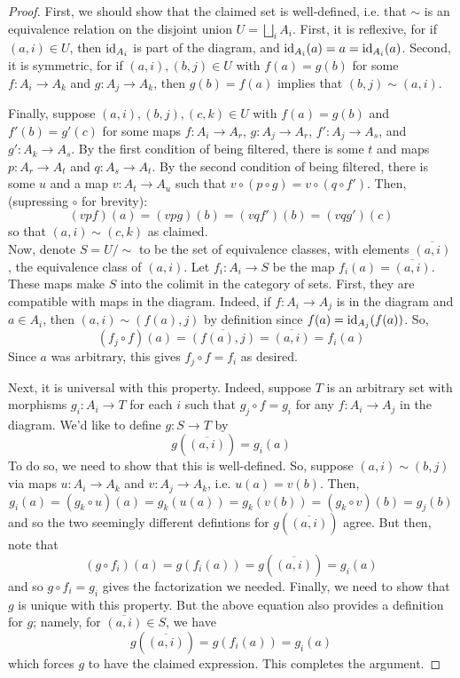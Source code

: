 \documentclass[12pt]{exam}
\begin{document}
\begin{proof}
	First, we should show that the claimed set is well-defined, i.e. that $\sim$ is an equivalence relation on the disjoint union $U = \bigsqcup_i A_i$. First, it is reflexive, for if $(a,i) \in U$, then $\operatorname{id}_{A_i}$ is part of the diagram, and $\operatorname{id}_{A_i}(a) = a = \operatorname{id}_{A_i}(a)$. Second, it is symmetric, for if $(a,i),(b,j) \in U$ with $f(a) = g(b)$ for some $f : A_i \to A_k$ and $g : A_j \to A_k$, then $g(b) = f(a)$ implies that $(b,j) \sim (a,i)$.
	
	Finally, suppose $(a,i),(b,j),(c,k) \in U$ with $f(a) = g(b)$ and $f'(b) = g'(c)$ for some maps $f : A_i \to A_r$, $g : A_j \to A_r$, $f' : A_j \to A_s$, and $g' : A_k \to A_s$. By the first condition of being filtered, there is some $t$ and maps $p : A_r \to A_t$ and $q : A_s \to A_t$. By the second condition of being filtered, there is some $u$ and a map $v : A_t \to A_u$ such that $v \circ (p \circ g) = v \circ (q \circ f')$. Then, (supressing $\circ$ for brevity):
	\[ (vpf)(a) = (vpg)(b) = (vqf')(b) = (vqg')(c) \]
	so that $(a,i) \sim (c,k)$ as claimed. \\
	
	Now, denote $S = U/\sim$ to be the set of equivalence classes, with elements $\overline{(a,i)}$, the equivalence class of $(a,i)$. Let $f_i : A_i \to S$ be the map $f_i(a) = \overline{(a,i)}$. These maps make $S$ into the colimit in the category of sets. First, they are compatible with maps in the diagram. Indeed, if $f : A_i \to A_j$ is in the diagram and $a \in A_i$, then $(a,i) \sim (f(a),j)$ by definition since $f(a) = \operatorname{id}_{A_j}(f(a))$. So,
	\[ (f_j \circ f)(a) = \overline{(f(a),j)} = \overline{(a,i)} = f_i(a) \]
	Since $a$ was arbitrary, this gives $f_j \circ f = f_i$ as desired.
	
	Next, it is universal with this property. Indeed, suppose $T$ is an arbitrary set with morphisms $g_i : A_i \to T$ for each $i$ such that $g_j \circ f = g_i$ for any $f : A_i \to A_j$ in the diagram. We'd like to define $g : S \to T$ by
	\[ g\left(\overline{(a,i)}\right) = g_i(a) \]
	To do so, we need to show that this is well-defined. So, suppose $(a,i) \sim (b,j)$ via maps $u : A_i \to A_k$ and $v : A_j \to A_k$, i.e. $u(a) = v(b)$. Then,
	\[ g_i(a) = (g_k \circ u)(a) = g_k(u(a)) = g_k(v(b)) = (g_k \circ v)(b) = g_j(b) \]
	and so the two seemingly different defintions for $g\left(\overline{(a,i)}\right)$ agree. But then, note that
	\[ (g \circ f_i)(a) = g(f_i(a)) = g\left(\overline{(a,i)}\right) = g_i(a) \]
	and so $g \circ f_i = g_i$ gives the factorization we needed. Finally, we need to show that $g$ is unique with this property. But the above equation also provides a definition for $g$; namely, for $\overline{(a,i)} \in S$, we have
	\[ g\left(\overline{(a,i)}\right) = g(f_i(a)) = g_i(a) \]
	which forces $g$ to have the claimed expression. This completes the argument.
\end{proof}
\end{document}
